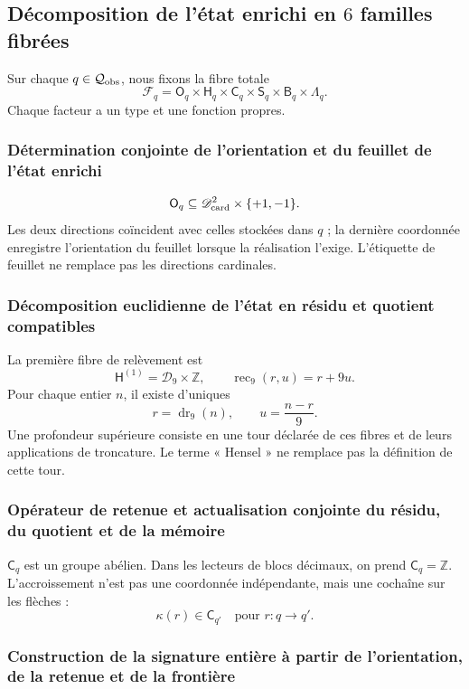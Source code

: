{\subsection{Décomposition de l’état enrichi en \(6\) familles fibrées}

Sur chaque \(q\in\mathcal Q_{\rm obs}\), nous fixons la fibre totale
\[
 \mathcal F_q=
 \mathsf O_q\times
 \mathsf H_q\times
 \mathsf C_q\times
 \mathsf S_q\times
 \mathsf B_q\times
 \Lambda_q.
\]
Chaque facteur a un type et une fonction propres.

\subsubsection{Détermination conjointe de l’orientation et du feuillet de l’état enrichi}

\[
 \mathsf O_q\subseteq
 \mathscr D_{\rm card}^2\times\{+1,-1\}.
\]
Les deux directions coïncident avec celles stockées dans \(q\) ; la dernière
coordonnée enregistre l’orientation du feuillet lorsque la réalisation l’exige.
L’étiquette de feuillet ne remplace pas les directions cardinales.

\subsubsection{Décomposition euclidienne de l’état en résidu et quotient compatibles}

La première fibre de relèvement est
\[
 \mathsf H^{(1)}=\mathcal D_9\times\mathbb Z,
 \qquad
 \operatorname{rec}_9(r,u)=r+9u.
\]
Pour chaque entier \(n\), il existe d’uniques
\[
 r=\operatorname{dr}_9(n),
 \qquad
 u=\frac{n-r}{9}.
\]
Une profondeur supérieure consiste en une tour déclarée de ces fibres et de leurs
applications de troncature. Le terme « Hensel » ne remplace pas la définition de
cette tour.

\subsubsection{Opérateur de retenue et actualisation conjointe du résidu, du quotient et de la mémoire}

\(\mathsf C_q\) est un groupe abélien. Dans les lecteurs de blocs décimaux,
on prend \(\mathsf C_q=\mathbb Z\). L’accroissement n’est pas une coordonnée
indépendante, mais une cochaîne sur les flèches :
\[
 \kappa(r)\in\mathsf C_{q'}
 \quad\text{pour }r:q\to q'.
\]

\subsubsection{Construction de la signature entière à partir de l’orientation, de la retenue et de la frontière}

}
